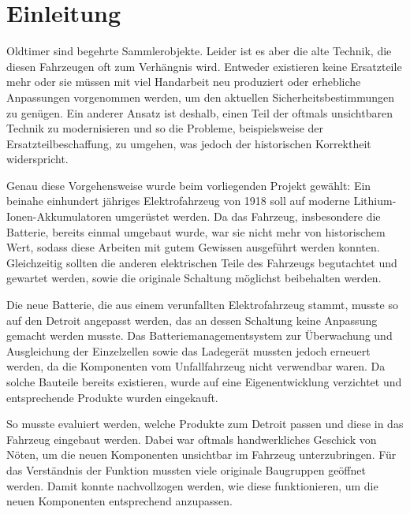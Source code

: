 \chapter{Einleitung}

Oldtimer sind begehrte Sammlerobjekte. Leider ist es aber die alte Technik, die diesen Fahrzeugen oft zum Verhängnis wird. Entweder existieren keine Ersatzteile mehr oder sie müssen mit viel Handarbeit neu produziert oder erhebliche Anpassungen vorgenommen werden, um den aktuellen Sicherheitsbestimmungen zu genügen. Ein anderer Ansatz ist deshalb, einen Teil der oftmals unsichtbaren Technik zu modernisieren und so die Probleme, beispielsweise der Ersatzteilbeschaffung, zu umgehen, was jedoch der historischen Korrektheit widerspricht.

Genau diese Vorgehensweise wurde beim vorliegenden Projekt gewählt: Ein beinahe einhundert jähriges Elektrofahrzeug von 1918 soll auf moderne Lithium-Ionen-Akkumulatoren umgerüstet werden. Da das Fahrzeug, insbesondere die Batterie, bereits einmal umgebaut wurde, war sie nicht mehr von historischem Wert, sodass diese Arbeiten mit gutem Gewissen ausgeführt werden konnten. Gleichzeitig sollten die anderen elektrischen Teile des Fahrzeugs begutachtet und gewartet werden, sowie die originale Schaltung möglichst beibehalten werden.

Die neue Batterie, die aus einem verunfallten Elektrofahrzeug stammt, musste so auf den Detroit angepasst werden, das an dessen Schaltung keine Anpassung gemacht werden musste. Das Batteriemanagementsystem zur Überwachung und Ausgleichung der Einzelzellen sowie das Ladegerät mussten jedoch erneuert werden, da die Komponenten vom Unfallfahrzeug nicht verwendbar waren. Da solche Bauteile bereits existieren, wurde auf eine Eigenentwicklung verzichtet und entsprechende Produkte wurden eingekauft.

So musste evaluiert werden, welche Produkte zum Detroit passen und diese in das Fahrzeug eingebaut werden. Dabei war oftmals handwerkliches Geschick von Nöten, um die neuen Komponenten unsichtbar im Fahrzeug unterzubringen. Für das Verständnis der Funktion mussten viele originale Baugruppen geöffnet werden. Damit konnte nachvollzogen werden, wie diese funktionieren, um die neuen Komponenten entsprechend anzupassen.

